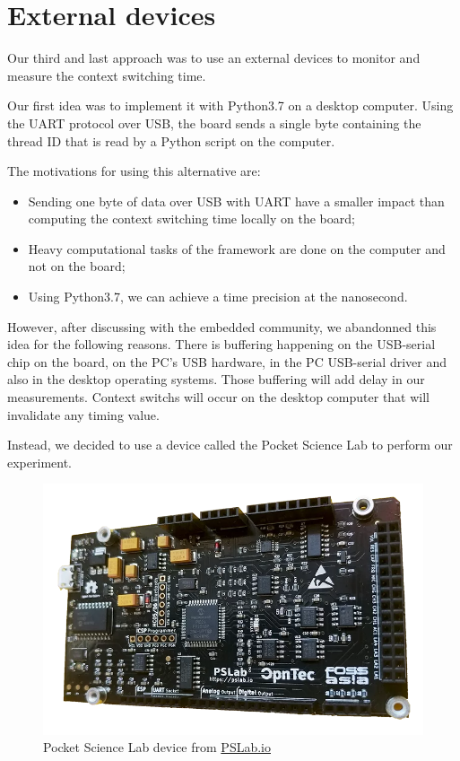 \section{External devices \label{sec:external}}

Our third and last approach was to use an external devices to monitor and measure the context switching time.

Our first idea was to implement it with Python3.7 on a desktop computer.
Using the UART protocol over USB, the board sends a single byte containing the thread ID that is read by a Python script on the computer.

The motivations for using this alternative are:
\begin{itemize}
  \item Sending one byte of data over USB with UART have a smaller impact than computing the context switching time locally on the board;
  \item Heavy computational tasks of the framework are done on the computer and not on the board;
  \item Using Python3.7, we can achieve a time precision at the nanosecond.
\end{itemize}

However, after discussing with the embedded community, we abandonned this idea for the following reasons.
There is buffering happening on the USB-serial chip on the board, on the PC's USB hardware, in the PC USB-serial driver and also in the desktop operating systems.
Those buffering will add delay in our measurements.
Context switchs will occur on the desktop computer that will invalidate any timing value.

Instead, we decided to use a device called the Pocket Science Lab to perform our experiment.

\begin{figure}[!ht]
  \centering
  \includegraphics[scale=0.25]{assets/pslab.png}
  \caption{\label{fig:pslab}Pocket Science Lab device from \href{https://pslab.io}{PSLab.io}}
\end{figure}

